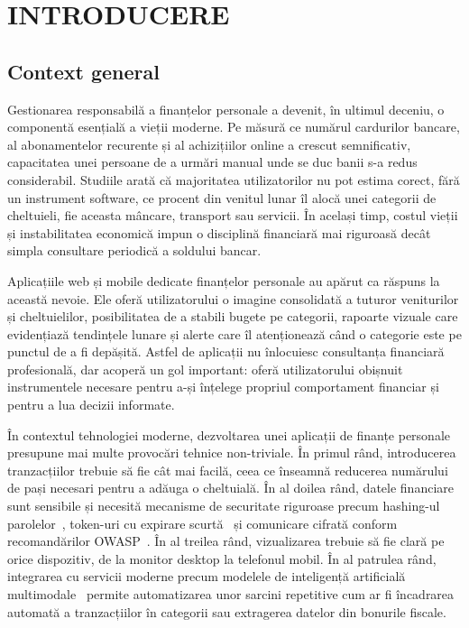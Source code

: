 \documentclass[12pt,a4paper,oneside]{report}
\begin{document}
\newpage
{}
\setcounter{page}{7}

\chapter{INTRODUCERE}

\section{Context general}

Gestionarea responsabilă a finanțelor personale a devenit, în ultimul deceniu, o componentă esențială a vieții moderne. Pe măsură ce numărul cardurilor bancare, al abonamentelor recurente și al achizițiilor online a crescut semnificativ, capacitatea unei persoane de a urmări manual unde se duc banii s-a redus considerabil. Studiile arată că majoritatea utilizatorilor nu pot estima corect, fără un instrument software, ce procent din venitul lunar îl alocă unei categorii de cheltuieli, fie aceasta mâncare, transport sau servicii. În același timp, costul vieții și instabilitatea economică impun o disciplină financiară mai riguroasă decât simpla consultare periodică a soldului bancar.

Aplicațiile web și mobile dedicate finanțelor personale au apărut ca răspuns la această nevoie. Ele oferă utilizatorului o imagine consolidată a tuturor veniturilor și cheltuielilor, posibilitatea de a stabili bugete pe categorii, rapoarte vizuale care evidențiază tendințele lunare și alerte care îl atenționează când o categorie este pe punctul de a fi depășită. Astfel de aplicații nu înlocuiesc consultanța financiară profesională, dar acoperă un gol important: oferă utilizatorului obișnuit instrumentele necesare pentru a-și înțelege propriul comportament financiar și pentru a lua decizii informate. \cite{ref:finapp}

În contextul tehnologiei moderne, dezvoltarea unei aplicații de finanțe personale presupune mai multe provocări tehnice non-triviale. În primul rând, introducerea tranzacțiilor trebuie să fie cât mai facilă, ceea ce înseamnă reducerea numărului de pași necesari pentru a adăuga o cheltuială. În al doilea rând, datele financiare sunt sensibile și necesită mecanisme de securitate riguroase precum hashing-ul parolelor~\cite{ref:bcrypt}, token-uri cu expirare scurtă~\cite{ref:jwt} și comunicare cifrată conform recomandărilor OWASP~\cite{ref:owasp}. În al treilea rând, vizualizarea trebuie să fie clară pe orice dispozitiv, de la monitor desktop la telefonul mobil. În al patrulea rând, integrarea cu servicii moderne precum modelele de inteligență artificială multimodale~\cite{ref:gemini} permite automatizarea unor sarcini repetitive cum ar fi încadrarea automată a tranzacțiilor în categorii sau extragerea datelor din bonurile fiscale.
\end{document}
